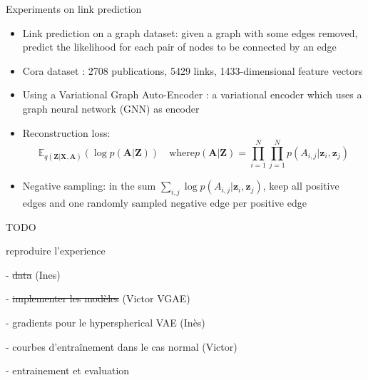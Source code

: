 \begin{frame}{Experiments on link prediction}

  \begin{itemize}
    \item Link prediction on a graph dataset: given a graph with some edges removed, predict the likelihood
    for each pair of nodes to be connected by an edge
    \item Cora dataset \cite{McCallum_2000}: 2708 publications, 5429 links, 1433-dimensional feature vectors
    \item Using a Variational Graph Auto-Encoder \cite{kipf_variational_2016}: a variational encoder which uses a
    graph neural network (GNN) as encoder
    \item Reconstruction loss:
        $$ \mathbb{E}_{q(\mathbf{Z}|\mathbf{X}, \mathbf{A})}(\log p(\mathbf{A}|\mathbf{Z})) \quad 
        \text{where} p(\mathbf{A}|\mathbf{Z}) = \prod_{i = 1}^N \prod_{j=1}^N p(A_{i, j}|\mathbf{z}_i, \mathbf{z}_j) $$
    \item Negative sampling: in the sum $\sum_{i, j} \log p(A_{i, j}|\mathbf{z}_i, \mathbf{z}_j)$, keep all
    positive edges and one randomly sampled negative edge per positive edge
  \end{itemize}
\end{frame}

\begin{frame}{TODO}

    reproduire l'experience 
  
    - \sout{data} (Ines)
  
    - \sout{implementer les modèles} (Victor VGAE)
    
    - gradients pour le hyperspherical VAE (Inès)
    
    - courbes d'entraînement dans le cas normal (Victor)
  
    - entrainement et evaluation 
  
  \end{frame}

